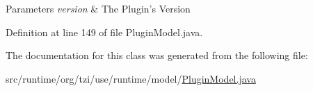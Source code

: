 \begin{DoxyParams}{Parameters}
{\em version} & The Plugin's Version \\
\hline
\end{DoxyParams}


Definition at line 149 of file Plugin\-Model.\-java.



The documentation for this class was generated from the following file\-:\begin{DoxyCompactItemize}
\item 
src/runtime/org/tzi/use/runtime/model/\hyperlink{_plugin_model_8java}{Plugin\-Model.\-java}\end{DoxyCompactItemize}
